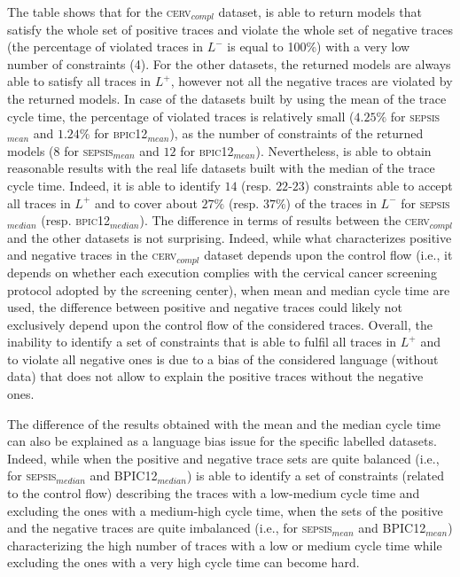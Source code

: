 The table shows that for the \textsc{cerv$_{compl}$} dataset, \nd is able to return models that satisfy the whole set of positive traces and violate the whole set of negative traces (the percentage of violated traces in $L^-$ is equal to 100\%) with a very low number of constraints (4). For the other datasets, the returned models are always able to satisfy all traces in $L^+$, however not all the negative traces are violated by the returned models. In case of the datasets built by using the mean of the trace cycle time, the percentage of violated traces is relatively small ($4.25\%$ for \textsc{sepsis$_{mean}$} and $1.24\%$ for \textsc{bpic12$_{mean}$}), as the number of constraints of the returned models ($8$ for \textsc{sepsis$_{mean}$} and $12$ for \textsc{bpic12$_{mean}$}). Nevertheless, \nd is able to obtain reasonable results with the real life datasets built with the median of the trace cycle time. Indeed, it is able to identify $14$ (resp. $22$-$23$) constraints able to accept all traces in $L^+$ and to cover about $27\%$ (resp. $37\%$) of the traces in $L^-$ for \textsc{sepsis$_{median}$} (resp. \textsc{bpic12$_{median}$}). The difference in terms of results between the \textsc{cerv$_{compl}$} and the other datasets is not surprising. Indeed, while what characterizes positive and negative traces in the \textsc{cerv$_{compl}$} dataset depends upon the control flow (i.e., it depends on whether each execution complies with the cervical cancer screening protocol adopted by the screening center), when mean and median cycle time are used, the difference between positive and negative traces could likely not exclusively depend upon the control flow of the considered traces. Overall, the inability to identify a set of constraints that is able to fulfil all traces  in $L^+$ and to violate all negative ones is due to a bias of the considered language (\declare without data) that does not allow to explain the positive traces without the negative ones.

The difference of the results obtained with the mean and the median cycle time can also be explained as a language bias issue for the specific labelled datasets. Indeed, while when the positive and negative trace sets are quite balanced (i.e., for \textsc{sepsis$_{median}$} and \textsc{BPIC12$_{median}$}) \nd is able to identify a set of constraints (related to the control flow) describing the traces with a low-medium cycle time and excluding the ones with a medium-high cycle time, when the sets of the positive and the negative traces are quite imbalanced (i.e., for \textsc{sepsis$_{mean}$} and \textsc{BPIC12$_{mean}$})
 characterizing the high number of traces with a low or medium cycle time while excluding the ones with a very high cycle time can become hard. 


